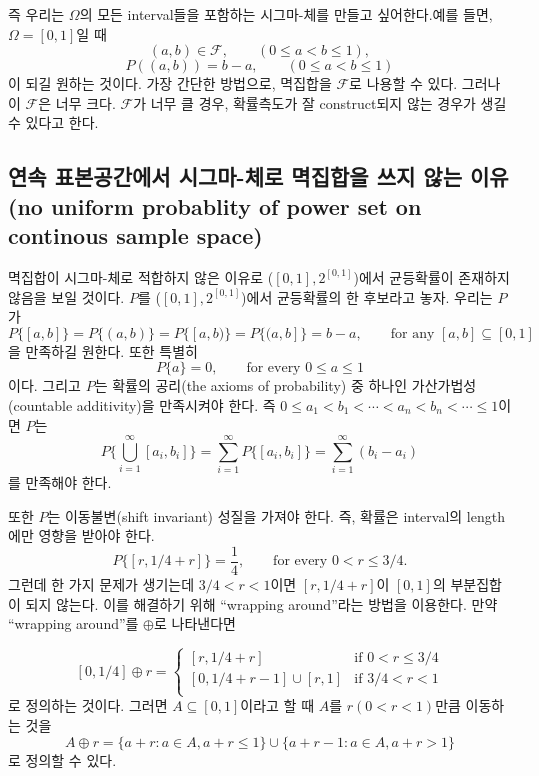 \documentclass[b5paper,]{scrbook}
\theoremstyle{plain}
\theoremstyle{definition}
\numberwithin{equation}{section}
\begin{document}
즉 우리는 \(\Omega\)의 모든 interval들을 포함하는 시그마-체를 만들고
싶어한다.예를 들면, \(\Omega=[0,1]\)일 때
\[(a,b)\in\mathcal{F}, \qquad{(0\leq a < b \leq 1),}\]
\[P((a,b))=b-a, \qquad{(0\leq a < b \leq 1)}\] 이 되길 원하는 것이다.
가장 간단한 방법으로, 멱집합을 \(\mathcal{F}\)로 나용할 수 있다. 그러나
이 \(\mathcal{F}\)은 너무 크다. \(\mathcal{F}\)가 너무 클 경우,
확률측도가 잘 construct되지 않는 경우가 생길 수 있다고 한다.

\subsection{연속 표본공간에서 시그마-체로 멱집합을 쓰지 않는 이유(no
uniform probablity of power set on continous sample
space)}\label{-------no-uniform-probablity-of-power-set-on-continous-sample-space}

멱집합이 시그마-체로 적합하지 않은 이유로 (\([0,1], 2^{[0,1]}\))에서
균등확률이 존재하지 않음을 보일 것이다. \(P\)를
(\([0,1], 2^{[0,1]}\))에서 균등확률의 한 후보라고 놓자. 우리는 \(P\)가
\[P\{[a,b]\}=P\{(a,b)\}=P\{[a,b)\}=P\{(a,b]\}=b-a, \qquad{\text{for any }[a,b]\subseteq [0,1]}\]
을 만족하길 원한다. 또한 특별히
\[P\{a\}=0, \qquad{\text{for every }0\leq a \leq 1}\] 이다. 그리고
\(P\)는 확률의 공리(the axioms of probability) 중 하나인
가산가법성(countable additivity)을 만족시켜야 한다. 즉
\(0\leq a_{1}<b_{1}<\cdots <a_{n}<b_{n}<\cdots \leq 1\)이면 \(P\)는
\[P\{\bigcup_{i=1}^{\infty}[a_{i},b_{i}]\}=\sum_{i=1}^{\infty}P\{[a_{i},b_{i}]\}=\sum_{i=1}^{\infty}(b_{i}-a_{i})\]
를 만족해야 한다.

또한 \(P\)는 이동불변(shift invariant) 성질을 가져야 한다. 즉, 확률은
interval의 length에만 영향을 받아야 한다.
\[P\{[r,1/4 +r]\}=\frac{1}{4}, \qquad{\text{for every } 0 < r \leq 3/4.}\]
그런데 한 가지 문제가 생기는데 \(3/4 <r < 1\)이면 \([r,1/4+r]\)이
\([0,1]\)의 부분집합이 되지 않는다. 이를 해결하기 위해 ``wrapping
around''라는 방법을 이용한다. 만약 ``wrapping around''를 \(\oplus\)로
나타낸다면

\[
[0,1/4]\oplus r = 
\begin{cases}
[r, 1/4 + r] & \text{if $0 < r \leq 3/4$} \\
[0,1/4+r-1]\cup [r,1] & \text{if $3/4 < r < 1$}\\
\end{cases}
\] 로 정의하는 것이다. 그러면 \(A\subseteq [0,1]\)이라고 할 때 \(A\)를
\(r (0<r<1)\)만큼 이동하는 것을
\[A\oplus r = \{ a+r : a \in A, a+r \leq 1 \} \cup \{ a+r-1: a\in A, a+r > 1\}\]
로 정의할 수 있다.
\end{document}
